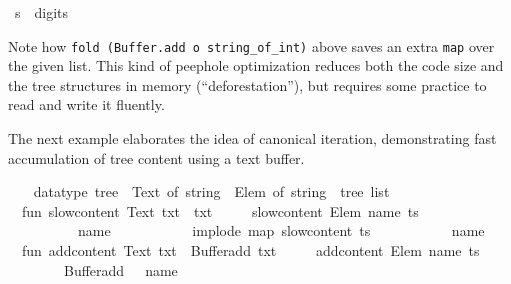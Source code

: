 \begin{isabellebody}
\ {\isacharparenleft}s\ {\isacharequal}\ {\isachardoublequote}digits{\isacharcolon}\ {}{}{}{}{}{}{}{}{}{}{\isachardoublequote}{\isacharparenright}{\isacharsemicolon}\isanewline
{\isacharverbatimclose}%
\endisatagML
{\isafoldML}%
%
\isadelimML
%
\endisadelimML
%
\begin{isamarkuptext}%
Note how \verb|fold (Buffer.add o string_of_int)| above saves
  an extra \verb|map| over the given list.  This kind of peephole
  optimization reduces both the code size and the tree structures in
  memory (``deforestation''), but requires some practice to read and
  write it fluently.

  \medskip The next example elaborates the idea of canonical
  iteration, demonstrating fast accumulation of tree content using a
  text buffer.%
\end{isamarkuptext}%
\isamarkuptrue%
%
\isadelimML
%
\endisadelimML
%
\isatagML
{}\isamarkupfalse%
\ {\isacharverbatimopen}\isanewline
\ \ datatype\ tree\ {\isacharequal}\ Text\ of\ string\ {\isacharbar}\ Elem\ of\ string\ {\isacharasterisk}\ tree\ list{\isacharsemicolon}\isanewline
\isanewline
\ \ fun\ slow{\isacharunderscore}content\ {\isacharparenleft}Text\ txt{\isacharparenright}\ {\isacharequal}\ txt\isanewline
\ \ \ \ {\isacharbar}\ slow{\isacharunderscore}content\ {\isacharparenleft}Elem\ {\isacharparenleft}name{\isacharcomma}\ ts{\isacharparenright}{\isacharparenright}\ {\isacharequal}\isanewline
\ \ \ \ \ \ \ \ {\isachardoublequote}{\isacharless}{\isachardoublequote}\ {\isacharcircum}\ name\ {\isacharcircum}\ {\isachardoublequote}{\isachargreater}{\isachardoublequote}\ {\isacharcircum}\isanewline
\ \ \ \ \ \ \ \ implode\ {\isacharparenleft}map\ slow{\isacharunderscore}content\ ts{\isacharparenright}\ {\isacharcircum}\isanewline
\ \ \ \ \ \ \ \ {\isachardoublequote}{\isacharless}{\isacharslash}{\isachardoublequote}\ {\isacharcircum}\ name\ {\isacharcircum}\ {\isachardoublequote}{\isachargreater}{\isachardoublequote}\isanewline
\isanewline
\ \ fun\ add{\isacharunderscore}content\ {\isacharparenleft}Text\ txt{\isacharparenright}\ {\isacharequal}\ Buffer{\isachardot}add\ txt\isanewline
\ \ \ \ {\isacharbar}\ add{\isacharunderscore}content\ {\isacharparenleft}Elem\ {\isacharparenleft}name{\isacharcomma}\ ts{\isacharparenright}{\isacharparenright}\ {\isacharequal}\isanewline
\ \ \ \ \ \ \ \ Buffer{\isachardot}add\ {\isacharparenleft}{\isachardoublequote}{\isacharless}{\isachardoublequote}\ {\isacharcircum}\ name\ {\isacharcircum}\ {\isachardoublequote}{\isachargreater}{\isachardoublequote}{\isacharparenright}\ {\isacharhash}{\isachargreater}\isanewline

\end{isabellebody}

